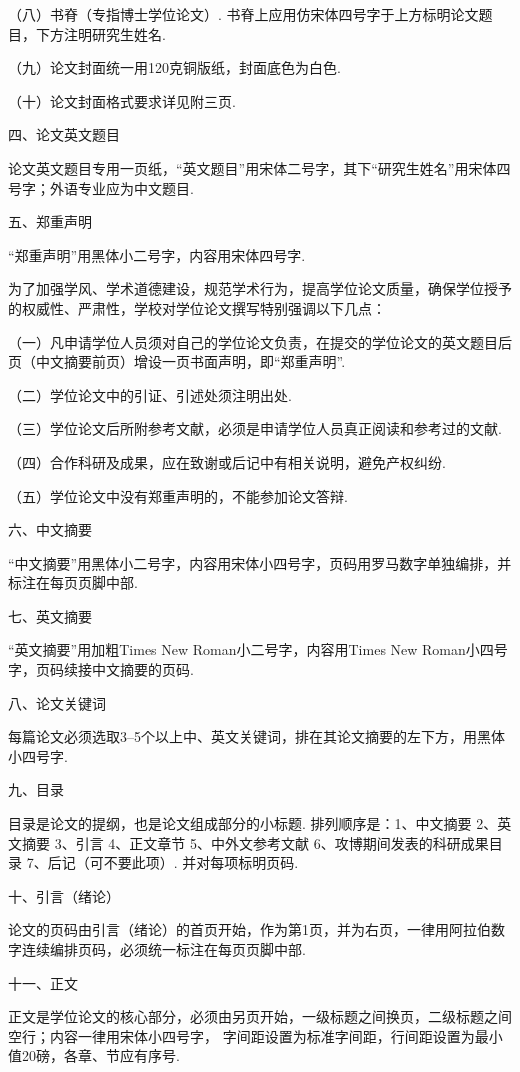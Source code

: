 \documentclass{ice_report}  %
\begin{document}
（八）书脊（专指博士学位论文）. 书脊上应用仿宋体四号字于上方标明论文题目，下方注明研究生姓名.

（九）论文封面统一用120克铜版纸，封面底色为白色.

（十）论文封面格式要求详见附三页.

{\heiti 四、论文英文题目}

论文英文题目专用一页纸，``英文题目''用宋体二号字，其下``研究生姓名''用宋体四号字；外语专业应为中文题目.

{\heiti 五、郑重声明}


``郑重声明''用黑体小二号字，内容用宋体四号字.

为了加强学风、学术道德建设，规范学术行为，提高学位论文质量，确保学位授予的权威性、严肃性，学校对学位论文撰写特别强调以下几点：

（一）凡申请学位人员须对自己的学位论文负责，在提交的学位论文的英文题目后页（中文摘要前页）增设一页书面声明，即``郑重声明''.

（二）学位论文中的引证、引述处须注明出处.

（三）学位论文后所附参考文献，必须是申请学位人员真正阅读和参考过的文献.

（四）合作科研及成果，应在致谢或后记中有相关说明，避免产权纠纷.

（五）学位论文中没有郑重声明的，不能参加论文答辩.

{\heiti 六、中文摘要}

``中文摘要''用黑体小二号字，内容用宋体小四号字，页码用罗马数字单独编排，并标注在每页页脚中部.

{\heiti 七、英文摘要}

``英文摘要''用加粗Times New Roman小二号字，内容用Times New Roman小四号字，页码续接中文摘要的页码.

{\heiti 八、论文关键词}

每篇论文必须选取3--5个以上中、英文关键词，排在其论文摘要的左下方，用黑体小四号字.

{\heiti 九、目录}

目录是论文的提纲，也是论文组成部分的小标题.
排列顺序是：1、中文摘要 2、英文摘要 3、引言 4、正文章节 5、中外文参考文献 6、攻博期间发表的科研成果目录
7、后记（可不要此项）. 并对每项标明页码.

{\heiti 十、引言（绪论）}

论文的页码由引言（绪论）的首页开始，作为第1页，并为右页，一律用阿拉伯数字连续编排页码，必须统一标注在每页页脚中部.

{\heiti 十一、正文}

正文是学位论文的核心部分，必须由另页开始，一级标题之间换页，二级标题之间空行；内容一律用宋体小四号字，
字间距设置为标准字间距，行间距设置为最小值20磅，各章、节应有序号.
\end{document}
